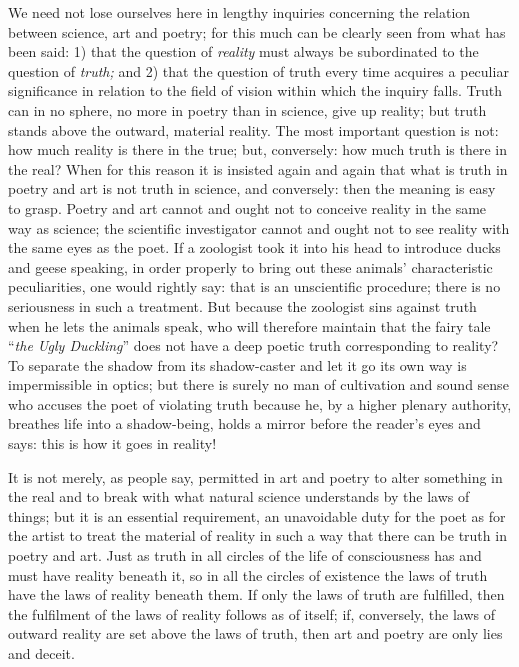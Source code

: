 \documentclass[12pt,a4paper,openany]{book}
\newcommand{\opage}[1]{\marginnote{\footnotesize\textit{[#1]}}}
\begin{document}
We need not lose ourselves here in lengthy inquiries
concerning the relation between science,
art and poetry; for this much can be clearly
seen from what has been said: 1) that the question of \emph{reality}
must always be subordinated to the question of \emph{truth;}
and 2) that the question of truth every time
\setcounter{footnote}{0}%
\opage{294}acquires a peculiar significance in relation to the field of vision
within which the inquiry falls. Truth can in no sphere,
no more in poetry than in science, give up reality;
but truth stands above the outward,
material reality. The most important question is
not: how much reality is there in the true; but,
conversely: how much truth is there in the real?
When for this reason it is insisted again and again that what
is truth in poetry and art is not truth in
science, and conversely: then the meaning is easy to grasp.
Poetry and art cannot and ought not to conceive reality
in the same way as science; the scientific
investigator cannot and ought not to see reality
with the same eyes as the poet. If a zoologist
took it into his head to introduce ducks and geese speaking, in order properly to
bring out these animals' characteristic peculiarities,
one would rightly say: that is an unscientific
procedure; there is no seriousness in such a
treatment. But because the zoologist sins against truth
when he lets the animals speak, who will therefore maintain
that the fairy tale ``\emph{the Ugly Duckling}'' does not have
a deep poetic truth corresponding to reality?
To separate the shadow from its shadow-caster and let it go
its own way is impermissible in optics; but there is
surely no man of cultivation and sound sense
who accuses the poet of violating truth because
he, by a higher plenary authority, breathes life into a shadow-being,
holds a mirror before the reader's eyes and says:
this is how it goes in reality!

It is not merely, as people say, permitted in art
and poetry to alter something in the real and to break
\setcounter{footnote}{0}%
\opage{295}with what natural science understands
by the laws of things; but it is an essential requirement, an unavoidable
duty for the poet as for the artist to treat
the material of reality in such a way that there can be
truth in poetry and art. Just as truth in all
circles of the life of consciousness has and must have reality
beneath it, so in all the circles of existence
the laws of truth have the laws of reality beneath them. If
only the laws of truth are fulfilled, then the fulfilment of
the laws of reality follows as of itself; if, conversely, the
laws of outward reality are set above the laws of truth, then
art and poetry are only lies and deceit.
\end{document}
